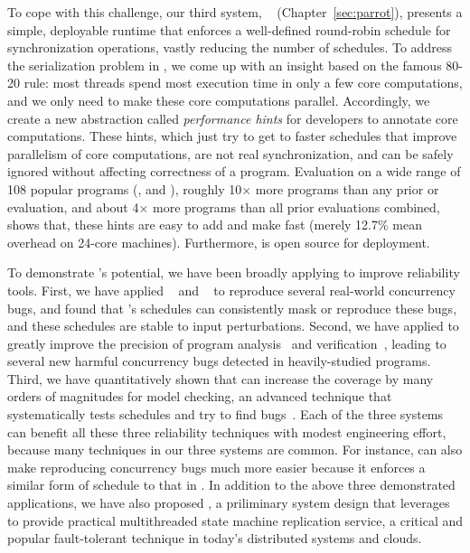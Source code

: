 To cope with this challenge, our third \smt system, \parrot~\cite{parrot:sosp13}
(Chapter~\ref{sec:parrot}), presents a simple, deployable runtime that enforces
a
well-defined round-robin schedule for synchronization operations, vastly
reducing the number of schedules. To address the serialization problem in \smt,
we come up with an insight based on the famous 80-20 rule: most threads spend
most execution time in only a few core computations, and we only need to make 
these core computations parallel. Accordingly, we create a new abstraction
called \emph{performance hints} for developers to annotate core computations.
These hints, which just try to get to faster schedules that improve parallelism
of core computations, are not real synchronization, and can be safely ignored
without affecting correctness of a program. Evaluation on a wide range of 108
popular programs (\eg, \bdb and \mplayer), roughly 10$\times$ more programs than
any prior \smt or \dmt evaluation, and about 4$\times$ more programs than all
prior evaluations combined, shows that, these hints are easy to add and make
\parrot fast (merely 12.7\% mean overhead on 24-core machines). Furthermore,
\parrot is open source for deployment.

To demonstrate \smt's potential, we have been broadly applying \smt to improve
reliability tools. First, we have applied \tern~\cite{cui:tern:osdi10}
and \peregrine~\cite{peregrine:sosp11} to reproduce several real-world
concurrency bugs, and found that \smt's schedules can consistently mask or
reproduce these bugs, and these schedules are stable to input perturbations.
Second, we have applied \peregrine to greatly improve the precision of program
analysis~\cite{wu:pldi12} and verification~\cite{wu:pldi12}, leading to several
new harmful concurrency bugs detected in heavily-studied programs. Third, we
have quantitatively shown that \parrot can increase the coverage by many orders
of magnitudes for model checking, an advanced technique that systematically
tests schedules and try to find bugs~\cite{parrot:sosp13, dbug:spin11,
modist:nsdi09}. Each of the three systems can benefit all these three
reliability techniques with modest engineering effort, because many techniques
in our three \smt systems are common. For instance, \parrot can also make
reproducing concurrency bugs much more easier because it enforces a similar form
of schedule to that in \tern. In addition to the above three demonstrated \smt
applications, we have also proposed \crane, a priliminary system design that
leverages \smt to provide practical multithreaded state machine replication
service, a critical and popular fault-tolerant technique in today's distributed
systems and clouds.

